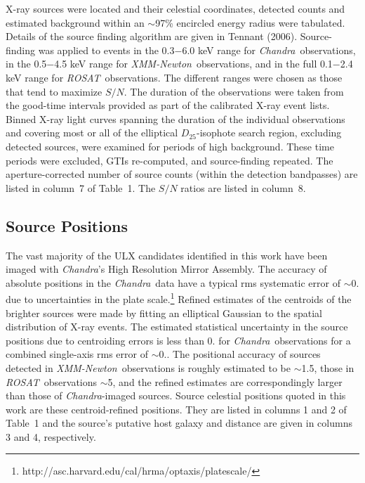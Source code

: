 \documentclass{article}
\newcommand{\DTF}{{$D_{25}$}}
\newcommand{\cxo}{{\sl Chandra}}
\newcommand{\xmm}{{\sl XMM-Newton}}
\newcommand{\ros}{{\sl ROSAT}}
\newcommand{\etal}{et al.}
\begin{document}
X-ray sources were located and
 their celestial coordinates, detected counts and estimated background
 within an $\sim$97\% encircled energy radius were tabulated.
Details of the source finding algorithm are given in Tennant (2006).
Source-finding was applied to events in the 
 0.3$-$6.0 keV range for \cxo\ observations, in the
 0.5$-$4.5 keV range for \xmm\ observations, and in the full
 0.1$-$2.4 keV range for \ros\ observations. The different ranges were
 chosen as those that tend to maximize $S/N$.
The duration of the observations were taken from the good-time intervals
 provided as part of the calibrated X-ray event lists.
Binned X-ray light curves spanning the duration of the 
 individual observations and covering most or all of the 
 elliptical \DTF-isophote search region, excluding detected sources,
 were examined for periods of high background. These time periods were 
 excluded, GTIs re-computed, and source-finding repeated.
The aperture-corrected number of source counts 
 (within the detection bandpasses) are listed in column~7 
of Table~1. The $S/N$ ratios are listed in column~8.

\subsection{Source Positions}

The vast majority of the ULX candidates identified in this work
 have been imaged with \cxo's High Resolution Mirror Assembly.
The accuracy of absolute positions in the \cxo\ data
 have a typical rms systematic error of $\sim$0. due to
 uncertainties in the plate scale.\footnote{http://asc.harvard.edu/cal/hrma/optaxis/platescale/}
Refined estimates of the centroids of the brighter sources were made by fitting
 an elliptical Gaussian to the spatial distribution of X-ray
 events.
The estimated 
 statistical uncertainty in the source positions due to centroiding errors
 is less than 0. for \cxo\ observations for a combined 
 single-axis rms error of $\sim$0..
The positional accuracy of sources detected in \xmm\ 
 observations is roughly estimated to be $\sim$1.5\arcsec,
 those in \ros\ observations $\sim$5\arcsec, and 
 the refined estimates are correspondingly larger than those of \cxo-imaged
 sources.
Source celestial positions quoted in this work are these centroid-refined
 positions. They are listed in columns 1 and 2 of Table~1 and the source's
 putative host galaxy and distance are given in columns 3 and 4, respectively.
\end{document}
